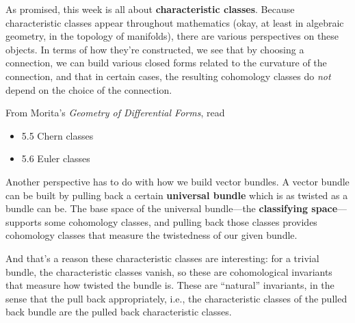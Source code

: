 \documentclass{homework}
\author{Jim Fowler}
\date{Week 13: Characteristic classes}
\begin{document}
\maketitle

As promised, this week is all about \textbf{characteristic classes}.
Because characteristic classes appear throughout mathematics (okay, at
least in algebraic geometry, in the topology of manifolds), there are
various perspectives on these objects.  In terms of how they're
constructed, we see that by choosing a connection, we can build
various closed forms related to the curvature of the connection, and
that in certain cases, the resulting cohomology classes do
\textit{not} depend on the choice of the connection.

From Morita's \textit{Geometry of Differential Forms}, read
\begin{itemize}
\item 5.5 Chern classes
\item 5.6 Euler classes
\end{itemize}

Another perspective has to do with how we build vector bundles.  A
vector bundle can be built by pulling back a certain \textbf{universal
bundle} which is as twisted as a bundle can be.  The base space of the
universal bundle---the \textbf{classifying space}---supports some
cohomology classes, and pulling back those classes provides cohomology
classes that measure the twistedness of our given bundle.

And that's a reason these characteristic classes are interesting: for
a trivial bundle, the characteristic classes vanish, so these are
cohomological invariants that measure how twisted the bundle is.
These are ``natural'' invariants, in the sense that the pull back
appropriately, i.e., the characteristic classes of the pulled back
bundle are the pulled back characteristic classes.
\end{document}
